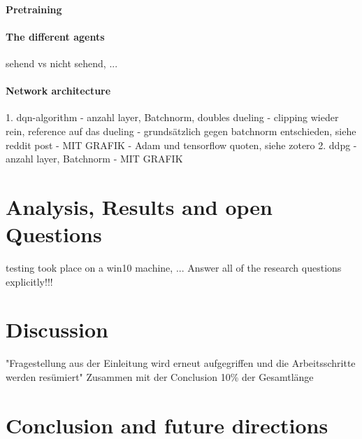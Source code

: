 \subsubsection{Pretraining}

\subsubsection{The different agents}

sehend vs nicht sehend, ...

\subsubsection{Network architecture}

1. dqn-algorithm
  - anzahl layer, Batchnorm, doubles dueling
  - clipping wieder rein, reference auf das dueling
  - grundsätzlich gegen batchnorm entschieden, siehe reddit post
  - MIT GRAFIK
  - Adam und tensorflow quoten, siehe zotero
2. ddpg
  - anzahl layer, Batchnorm
  - MIT GRAFIK

\chapter{Analysis, Results and open Questions}

testing took place on a win10 machine, ...
Answer all of the research questions explicitly!!!

\chapter{Discussion}

"Fragestellung aus der Einleitung wird erneut aufgegriffen und die Arbeitsschritte
werden resümiert"
Zusammen mit der Conclusion 10\% der Gesamtlänge

\chapter{Conclusion and future directions}





